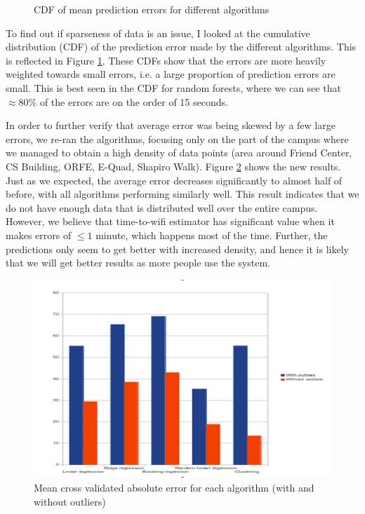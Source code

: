 \documentclass[12pt, fleqn]{article}
\begin{document}
\begin{enumerate}
\begin{figure}[htp]
  \caption{CDF of mean prediction errors for different algorithms \label{fig-cdf}}
\end{figure}

To find out if sparseness of data is an issue, I looked at the cumulative 
distribution (CDF) of the prediction error made by the different algorithms. This is 
reflected in Figure \ref{fig-cdf}. These CDFs show that the errors are more 
heavily weighted towards small errors, i.e. a large proportion of prediction 
errors are small. This is best seen in the CDF for random forests, where we can 
see that $\approx 80\%$ of the errors are on the order of 15 seconds. 

In order to further verify that average error was being skewed by a few large errors, 
we re-ran the algorithms, focusing only on the part of the campus 
where we managed to obtain a high density of data points (area around Friend Center, 
CS Building, ORFE, E-Quad, Shapiro Walk). Figure \ref{fig-error-outliers} shows the new results. Just as we expected, 
the average error decreases significantly to almost half of before, with all algorithms 
performing similarly well. This result indicates that we do not have enough data that is
distributed well over the entire campus. However, we believe 
that time-to-wifi estimator has significant value when it makes errors of $\leq 1$ 
minute,  which happens most of the time. Further, the predictions only seem to 
get better with increased density, and hence it is likely that we will get 
better results as more people use the system. 
\end{enumerate}

\medskip
\begin{figure}[htp]
\centering
\includegraphics[scale=0.5]{img/error-outliers.png}
\caption{Mean cross validated absolute error for each algorithm (with and without outliers)\label{fig-error-outliers}}
\end{figure}
\medskip
\end{document}
